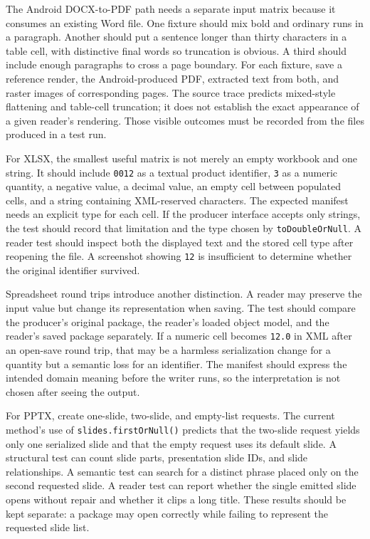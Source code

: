 \documentclass[10pt,letterpaper]{article}
\begin{document}
The Android DOCX-to-PDF path needs a separate input matrix because it consumes an existing Word file. One fixture should mix bold and ordinary runs in a paragraph. Another should put a sentence longer than thirty characters in a table cell, with distinctive final words so truncation is obvious. A third should include enough paragraphs to cross a page boundary. For each fixture, save a reference render, the Android-produced PDF, extracted text from both, and raster images of corresponding pages. The source trace predicts mixed-style flattening and table-cell truncation; it does not establish the exact appearance of a given reader's rendering. Those visible outcomes must be recorded from the files produced in a test run.

For XLSX, the smallest useful matrix is not merely an empty workbook and one string. It should include \texttt{0012} as a textual product identifier, \texttt{3} as a numeric quantity, a negative value, a decimal value, an empty cell between populated cells, and a string containing XML-reserved characters. The expected manifest needs an explicit type for each cell. If the producer interface accepts only strings, the test should record that limitation and the type chosen by \texttt{toDoubleOrNull}. A reader test should inspect both the displayed text and the stored cell type after reopening the file. A screenshot showing \texttt{12} is insufficient to determine whether the original identifier survived.

Spreadsheet round trips introduce another distinction. A reader may preserve the input value but change its representation when saving. The test should compare the producer's original package, the reader's loaded object model, and the reader's saved package separately. If a numeric cell becomes \texttt{12.0} in XML after an open-save round trip, that may be a harmless serialization change for a quantity but a semantic loss for an identifier. The manifest should express the intended domain meaning before the writer runs, so the interpretation is not chosen after seeing the output.

For PPTX, create one-slide, two-slide, and empty-list requests. The current method's use of \texttt{slides.firstOrNull()} predicts that the two-slide request yields only one serialized slide and that the empty request uses its default slide. A structural test can count slide parts, presentation slide IDs, and slide relationships. A semantic test can search for a distinct phrase placed only on the second requested slide. A reader test can report whether the single emitted slide opens without repair and whether it clips a long title. These results should be kept separate: a package may open correctly while failing to represent the requested slide list.
\end{document}
